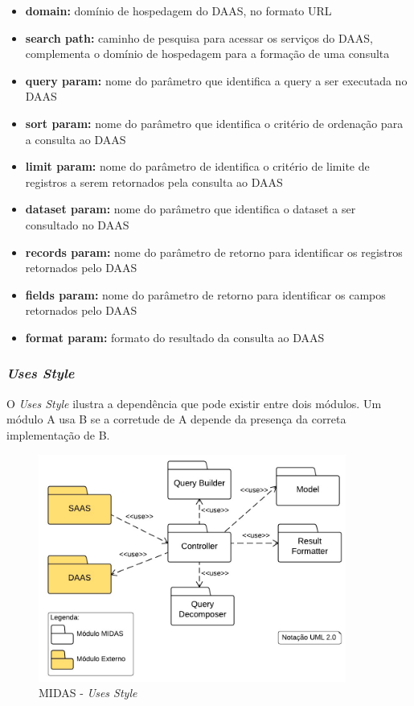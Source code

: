 \documentclass[11pt,a4paper]{article}
\begin{document}
\begin{itemize}
\item \textbf{domain: } domínio de hospedagem do DAAS, no formato URL \item \textbf{search path: } caminho de pesquisa para acessar os serviços do DAAS, complementa o domínio de hospedagem para a formação de uma consulta
\item \textbf{query param: } nome do parâmetro que identifica a query a ser executada no DAAS 
\item \textbf{sort param: } nome do parâmetro que identifica o critério de ordenação para a consulta ao DAAS
\item \textbf{limit param: } nome do parâmetro de identifica o critério de limite de registros a serem retornados pela consulta ao DAAS
\item \textbf{dataset param: } nome do parâmetro que identifica o dataset a ser consultado no DAAS 
\item \textbf{records param: } nome do parâmetro de retorno para identificar os registros retornados pelo DAAS
\item \textbf{fields param: } nome do parâmetro de retorno para identificar os campos retornados pelo DAAS
\item \textbf{format param: } formato do resultado da consulta ao DAAS
\end{itemize}



\subsubsection{\textit{Uses Style}}

O \textit{Uses Style} ilustra a dependência que pode existir entre dois módulos. Um módulo A usa B se a corretude de A depende da presença da correta implementação de B. 

\begin{figure} [h!]
  \centering
    \includegraphics[width=0.9\textwidth]{MIDAS_-_Estilo_Uses}
  \caption{MIDAS - \textit{Uses Style}}
  \label{uses}
\end{figure}
\end{document}
